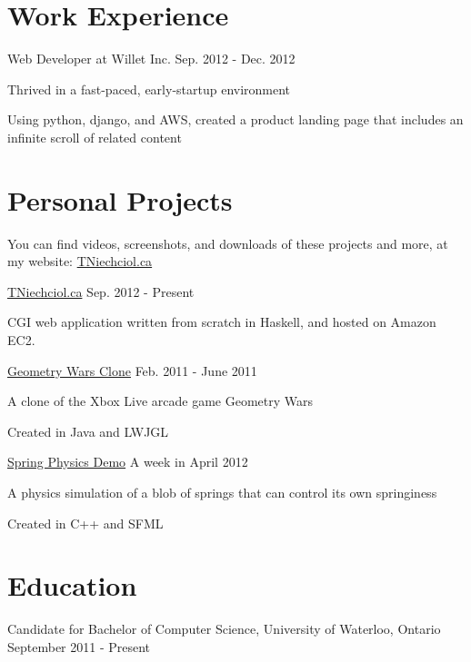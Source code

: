 \documentclass[10pt,letterpaper]{article}
\begin{document}
\section*{Work Experience}
    \begin{description}
        \item Web Developer at Willet Inc. \hfill Sep. 2012 - Dec. 2012
        \begin{description}
            \item Thrived in a fast-paced, early-startup environment
            \item Using python, django, and AWS, created a product landing page that includes an infinite scroll of related content
        \end{description}
    \end{description}

\section*{Personal Projects}
    \begin{description}
        \item You can find videos, screenshots, and downloads of these projects and more, at my website: \href{http://TNiechciol.ca}{TNiechciol.ca}
        \item \href{https://github.com/TerranceN/TNiechciol.ca}{TNiechciol.ca}
        \hfill Sep. 2012 - Present
        \begin{description}
            \item CGI web application written from scratch in Haskell, and hosted on Amazon EC2.
        \end{description}
        \item \href{http://tniechciol.ca/Projects/GeoWarsClone/}{Geometry Wars Clone}
        \hfill Feb. 2011 - June 2011
        \begin{description}
            \item A clone of the Xbox Live arcade game Geometry Wars
            \item Created in Java and LWJGL
        \end{description}
        \item \href{http://tniechciol.ca/Projects/SpringPhysics/}{Spring Physics Demo}
        \hfill A week in April 2012
        \begin{description}
            \item A physics simulation of a blob of springs that can control its own springiness
            \item Created in C++ and SFML
        \end{description}
    \end{description}

\section*{Education}
    \begin{description}
        \item Candidate for Bachelor of Computer Science, University of Waterloo, Ontario \hfill September 2011 - Present
    \end{description}
\end{document}
